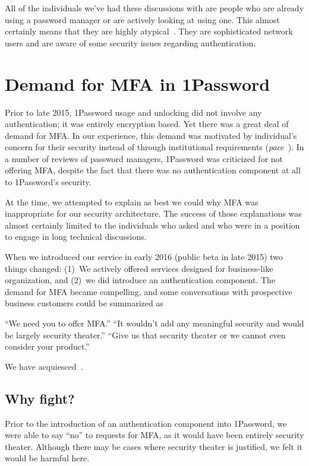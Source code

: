 \documentclass{soups}
\begin{document}
All of the individuals we've had these discussions with are people who are already using a password manager or are actively looking at using one.
This almost certainly means that they are highly atypical~\autocite{Stobert2014:agony}. 
They are sophisticated network users and are aware of some security issues regarding authentication.

\section{Demand for MFA in 1Password}\label{sec:demand}

Prior to late 2015, 1Password usage and unlocking did not involve any
authentication; it was entirely encryption based.
Yet there was a great deal of demand for MFA.\@
In our experience, this demand was motivated by individual's concern for their security
instead of through institutional requirements (\textit{pace}~\autocite{CristofaroDFN13}).
In a number of reviews of password managers, 1Password was criticized for not offering MFA, despite the fact that there was no authentication component at all to 1Password's security.

At the time, we attempted to explain as best we could why MFA was inappropriate for our security architecture. The success of those explanations was almost certainly limited to the individuals who asked and who were in a position to engage in long technical discussions.

When we introduced our service in early 2016 (public beta in late 2015) two things changed:
(1)~We actively offered services designed for business-like organization, and (2)~we did introduce an authentication component.
The demand for MFA became compelling,
and some conversations with prospective business customers could be summarized as 

“We need you to offer MFA.\@”\newline
“It wouldn't add any meaningful security and would be largely security theater.”\newline
“Give us that security theater or we cannot even consider your product.”

We have acquiesced~\autocite{Fillion18:mfa}.

\subsection{Why fight?}

Prior to the introduction of an authentication component into 1Password, we were able to say ``no'' to requests for MFA, as it would have been entirely security theater.
Although there may be cases where security theater is justified, we felt it would be harmful here.
\end{document}

